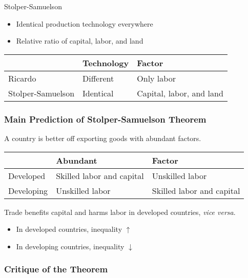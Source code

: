\documentclass[
]{book}
\begin{document}
Stolper-Samuelson

\begin{itemize}
\item
  Identical production technology everywhere
\item
  Relative ratio of capital, labor, and land
\end{itemize}

\begin{tabu} to 
\hline
  & Technology & Factor\\
\hline
Ricardo & Different & Only labor\\
\hline
Stolper-Samuelson & Identical & Capital, labor, and land\\
\hline
\end{tabu}

\hypertarget{main-prediction-of-stolper-samuelson-theorem}{%
\subsubsection{Main Prediction of Stolper-Samuelson Theorem}\label{main-prediction-of-stolper-samuelson-theorem}}

A country is better off exporting goods with abundant factors.

\begin{tabu} to 
\hline
  & Abundant & Factor\\
\hline
Developed & Skilled labor and capital & Unskilled labor\\
\hline
Developing & Unskilled labor & Skilled labor and capital\\
\hline
\end{tabu}

Trade benefits capital and harms labor in developed countries, \emph{vice versa}.

\begin{itemize}
\item
  In developed countries, inequality \(\uparrow\)
\item
  In developing countries, inequality \(\downarrow\)
\end{itemize}

\hypertarget{critique-of-the-theorem}{%
\subsubsection{Critique of the Theorem}\label{critique-of-the-theorem}}
\end{document}
